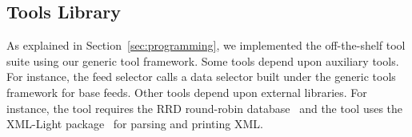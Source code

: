 \subsection{Tools Library}
As explained in Section~\ref{sec:programming}, we implemented the
\padsd{} off-the-shelf tool suite using our generic tool framework. 
Some tools depend upon auxiliary tools.  
For instance, the feed selector calls a data selector built under
the \padsml{} generic tools framework \cite{padsml-padl} for base feeds.
Other tools depend upon external libraries. For instance, the
 tool requires the RRD round-robin database~\cite{rrdtool} and
the  tool uses the XML-Light package~\cite{xmllight} for
parsing and printing XML.

